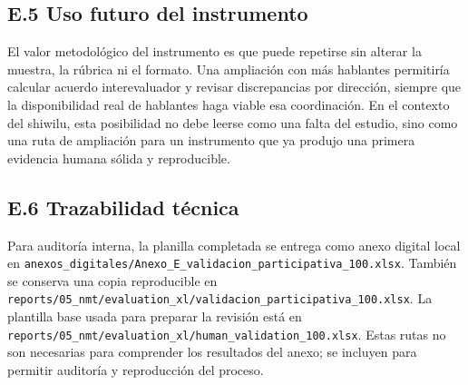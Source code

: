 \documentclass[12pt,a4paper,oneside]{book}
\newcommand{\filepath}[1]{\nolinkurl{#1}}
\begin{document}
\begin{table}[h]
\centering
\caption{Correcciones representativas registradas por el revisor.}
\label{tab:anexo-validacion-ejemplos}
\end{table}

\subsection*{E.5 Uso futuro del instrumento}

El valor metodológico del instrumento es que puede repetirse sin alterar la muestra, la rúbrica ni el formato. Una ampliación con más hablantes permitiría calcular acuerdo interevaluador y revisar discrepancias por dirección, siempre que la disponibilidad real de hablantes haga viable esa coordinación. En el contexto del shiwilu, esta posibilidad no debe leerse como una falta del estudio, sino como una ruta de ampliación para un instrumento que ya produjo una primera evidencia humana sólida y reproducible.

\subsection*{E.6 Trazabilidad técnica}

Para auditoría interna, la planilla completada se entrega como anexo digital local en \filepath{anexos\_digitales/Anexo\_E\_validacion\_participativa\_100.xlsx}. También se conserva una copia reproducible en \filepath{reports/05\_nmt/evaluation\_xl/validacion\_participativa\_100.xlsx}. La plantilla base usada para preparar la revisión está en \filepath{reports/05\_nmt/evaluation\_xl/human\_validation\_100.xlsx}. Estas rutas no son necesarias para comprender los resultados del anexo; se incluyen para permitir auditoría y reproducción del proceso.
\end{document}
